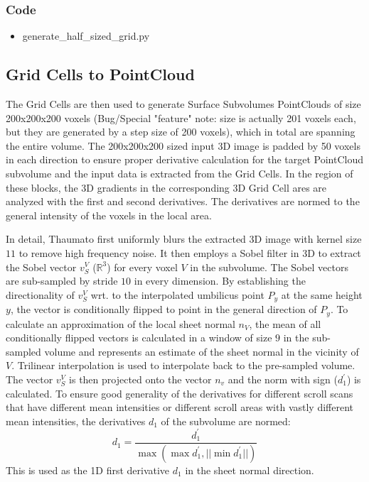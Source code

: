 \documentclass[peerreview]{IEEEtran}
\begin{document}
\subsubsection{Code}
\begin{itemize}
    \item generate\_half\_sized\_grid.py
\end{itemize}

\subsection{Grid Cells to PointCloud}
\label{pointcloud}
The Grid Cells are then used to generate Surface Subvolumes PointClouds of size 200x200x200 voxels (Bug/Special "feature" note: size is actually 201 voxels each, but they are generated by a step size of 200 voxels), which in total are spanning the entire volume. The 200x200x200 sized input 3D image is padded by 50 voxels in each direction to ensure proper derivative calculation for the target PointCloud subvolume and the input data is extracted from the Grid Cells. In the region of these blocks, the 3D gradients in the corresponding 3D Grid Cell ares are analyzed with the first and second derivatives. The derivatives are normed to the general intensity of the voxels in the local area.

In detail, Thaumato first uniformly blurs the extracted 3D image with kernel size $11$ to remove high frequency noise. It then employs a Sobel filter in 3D to extract the Sobel vector $v_S^V$ ($\mathbb{R}^{3}$) for every voxel $V$ in the subvolume. The Sobel vectors are sub-sampled by stride $10$ in every dimension. By establishing the directionality of $v_S^V$ wrt. to the interpolated umbilicus point $P_y$ at the same height $y$, the vector is conditionally flipped to point in the general direction of $P_y$. To calculate an approximation of the local sheet normal $n_V$, the mean of all conditionally flipped vectors is calculated in a window of size $9$ in the sub-sampled volume and represents an estimate of the sheet normal in the vicinity of $V$. Trilinear interpolation is used to interpolate back to the pre-sampled volume. The vector  $v_S^V$ is then projected onto the vector $n_v$ and the norm with sign ($d_1^{'}$) is calculated. To ensure good generality of the derivatives for different scroll scans that have different mean intensities or different scroll areas with vastly different mean intensities, the derivatives $d_1$ of the subvolume are normed:
\[
d_1 = \frac{d_1^{'}}{\max (\max{d_1^{'}, ||\min d_1^{'}||})}
\]
This is used as the 1D first derivative $d_1$ in the sheet normal direction.
\end{document}
